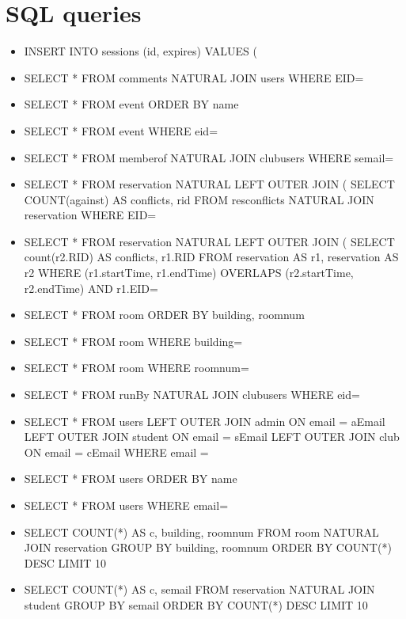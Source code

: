 \documentclass{article}
\begin{document}
\section{SQL queries}
\begin{itemize}
\item INSERT INTO sessions (id, expires) VALUES (%
\item SELECT * FROM comments NATURAL JOIN users WHERE EID=%
\item SELECT * FROM event ORDER BY name
\item SELECT * FROM event WHERE eid=%
\item SELECT * FROM memberof NATURAL JOIN clubusers WHERE semail=%
\item SELECT * FROM reservation NATURAL LEFT OUTER JOIN ( SELECT COUNT(against) AS conflicts, rid FROM resconflicts NATURAL JOIN reservation WHERE EID=%
\item SELECT * FROM reservation NATURAL LEFT OUTER JOIN ( SELECT count(r2.RID) AS conflicts, r1.RID FROM reservation AS r1, reservation AS r2 WHERE (r1.startTime, r1.endTime) OVERLAPS (r2.startTime, r2.endTime) AND r1.EID=%
\item SELECT * FROM room ORDER BY building, roomnum
\item SELECT * FROM room WHERE building=%
\item SELECT * FROM room WHERE roomnum=%
\item SELECT * FROM runBy NATURAL JOIN clubusers WHERE eid=%
\item SELECT * FROM users LEFT OUTER JOIN admin ON email = aEmail LEFT OUTER JOIN student ON email = sEmail LEFT OUTER JOIN club ON email = cEmail WHERE email = %
\item SELECT * FROM users ORDER BY name
\item SELECT * FROM users WHERE email=%
\item SELECT COUNT(*) AS c, building, roomnum FROM room NATURAL JOIN reservation GROUP BY building, roomnum ORDER BY COUNT(*) DESC LIMIT 10
\item SELECT COUNT(*) AS c, semail FROM reservation NATURAL JOIN student GROUP BY semail ORDER BY COUNT(*) DESC LIMIT 10

\end{itemize}
\end{document}
